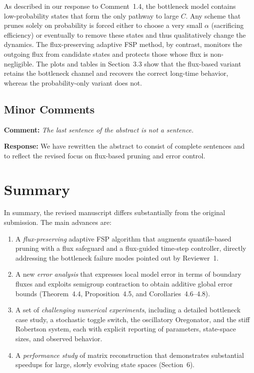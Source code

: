\documentclass[11pt]{article}
\begin{document}
As described in our response to Comment~1.4, the bottleneck model contains
low-probability states that form the only pathway to large $C$. Any scheme that
prunes solely on probability is forced either to choose a very small $\alpha$
(sacrificing efficiency) or eventually to remove these states and thus
qualitatively change the dynamics. The flux-preserving adaptive FSP method, by
contrast, monitors the outgoing flux from candidate states and protects those whose
flux is non-negligible. The plots and tables in Section~3.3 show that the
flux-based variant retains the bottleneck channel and recovers the correct
long-time behavior, whereas the probability-only variant does not.


\subsection*{Minor Comments}

\noindent\textbf{Comment:} \textit{The last sentence of the abstract is not a sentence.}

\textbf{Response:} We have rewritten the abstract to consist of complete sentences and
to reflect the revised focus on flux-based pruning and error control.

\section*{Summary}

In summary, the revised manuscript differs substantially from the original
submission. The main advances are:

\begin{enumerate}
  \item A \emph{flux-preserving} adaptive FSP algorithm that augments
        quantile-based pruning with a flux safeguard and a flux-guided time-step
        controller, directly addressing the bottleneck failure modes pointed out
        by Reviewer~1.
  \item A new \emph{error analysis} that expresses local model error in terms of
        boundary fluxes and exploits semigroup contraction to obtain additive
        global error bounds (Theorem~4.4, Proposition~4.5, and
        Corollaries~4.6–4.8).
  \item A set of \emph{challenging numerical experiments}, including a detailed
        bottleneck case study, a stochastic toggle switch, the oscillatory
        Oregonator, and the stiff Robertson system, each with explicit reporting of
        parameters, state-space sizes, and observed behavior.
  \item A \emph{performance study} of matrix reconstruction that demonstrates
        substantial speedups for large, slowly evolving state spaces (Section~6).
\end{enumerate}
\end{document}
